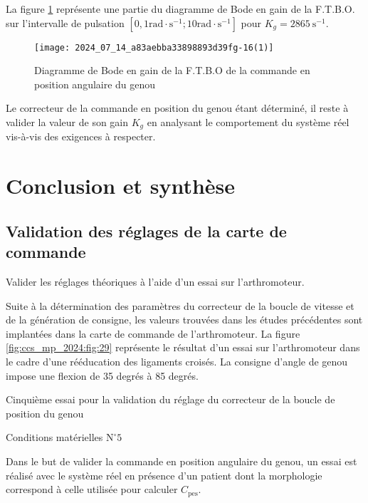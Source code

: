 La figure \ref{fig:ccs_mp_2024:fig:27} représente une partie du diagramme de Bode en gain de la F.T.B.O. sur l'intervalle de pulsation $\left[0,1 \mathrm{rad} \cdot \mathrm{s}^{-1} ; 10 \mathrm{rad} \cdot \mathrm{s}^{-1}\right]$ pour $K_{g}=2865 \mathrm{~s}^{-1}$.



\begin{figure}[!h]\centering
\texttt{[image: 2024\_07\_14\_a83aebba33898893d39fg-16(1)]}

\caption{\label{fig:ccs_mp_2024:fig:27}Diagramme de Bode en gain de la F.T.B.O de la commande en position angulaire du genou}
\end{figure}

Le correcteur de la commande en position du genou étant déterminé, il reste à valider la valeur de son gain $K_{g}$ en analysant le comportement du système réel vis-à-vis des exigences à respecter.

\section{Conclusion et synthèse}
\subsection{Validation des réglages de la carte de commande}

\begin{obj}
Valider les réglages théoriques à l'aide d'un essai sur l'arthromoteur.
\end{obj}

Suite à la détermination des paramètres du correcteur de la boucle de vitesse et de la génération de consigne, les valeurs trouvées dans les études précédentes sont implantées dans la carte de commande de l'arthromoteur. La figure \ref{fig:ccs_mp_2024:fig:29} représente le résultat d'un essai sur l'arthromoteur dans le cadre d'une rééducation des ligaments croisés. La consigne d'angle de genou impose une flexion de 35 degrés à 85 degrés.

Cinquième essai pour la validation du réglage du correcteur de la boucle de position du genou

Conditions matérielles $\mathrm{N}^{\circ} 5$

Dans le but de valider la commande en position angulaire du genou, un essai est réalisé avec le système réel en présence d'un patient dont la morphologie correspond à celle utilisée pour calculer $C_{\mathrm{pes}}$.

